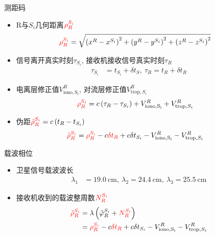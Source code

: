 \begin{frame}{测距码}
    \begin{itemize}
        \item R与$S _ i$几何距离$\textcolor{red}{\rho _ R ^ { S _ i }}$
        \begin{align*}
            \textcolor{red}{\rho _ R ^ { S _ i }} &= \sqrt{ \left( x ^ R - x ^ { S _ i } \right) ^ 2
            + \left( y ^ R - y ^ { S _ i } \right) ^ 2
            + \left( z ^ R - z ^ { S _ i } \right) ^ 2 }
        \end{align*}
        \item 信号离开真实时刻$\tau _ { S _ i }$, 接收机接收信号真实时刻$\tau _ R$
        \begin{align*}
            \tau _ { S _ i } &= t _ { S _ i } + \delta t _ S,\
            \tau _ R = t _ R + \delta t _ R
        \end{align*}
        \item 电离层修正值$V _ { \mathrm{ iono, S _ i } } ^ R$, 对流层修正值$V _ { \mathrm{ trop }, S _ i } ^ R$
        \begin{align*}
            \textcolor{red}{\rho _ R ^ { S _ i }} &= c \left( \tau _ R - \tau _ { S _ i } \right)
            + V _ { \mathrm{ iono, S _ i } } ^ R + V _ { \mathrm{ trop }, S _ i } ^ R
        \end{align*}
        \item 伪距${\color{red} \tilde \rho _ R ^ { S _ i } } = c \left( t _ R - t _ { S _ i } \right)$
        \begin{align*}
            {\color{red} \tilde \rho _ R ^ { S _ i } } &= \textcolor{red}{ \rho _ R ^ { S _ i } } - 
            c \textcolor{red}{ \delta t _ R } + c \delta t _ { S _ i }
            - V _ { \mathrm{ iono, S _ i } } ^ R - V _ { \mathrm{ trop }, S _ i } ^ R
        \end{align*}
    \end{itemize}
\end{frame}

\begin{frame}{载波相位}
    \begin{itemize}
        \item 卫星信号载波波长
        \begin{align*}
            \lambda _ 1 &= 19.0 \ \mathrm{ cm },\
            \lambda _ 2 = 24.4 \ \mathrm{ cm }, \
            \lambda _ 3 = 25.5 \ \mathrm{ cm }
        \end{align*}
        \item 接收机收到的载波整周数$\textcolor{red}{N _ R ^ { S _ i }}$
        \begin{align*}
            \textcolor{red}{\tilde \rho _ R ^ { S _ i }} &=
            \lambda \left( \tilde \varphi _ R ^ { S _ i } +
            \textcolor{red}{N _ R ^ { S _ i }} \right) \notag \\
            &= \textcolor{red}{ \rho _ R ^ { S _ i } } - 
            c \textcolor{red}{ \delta t _ R } + c \delta t _ { S _ i }
            - V _ { \mathrm{ iono, S _ i } } ^ R - V _ { \mathrm{ trop }, S _ i } ^ R
        \end{align*}
    \end{itemize}
\end{frame}